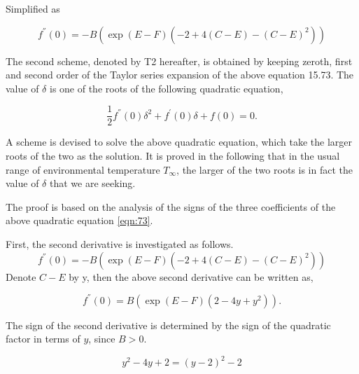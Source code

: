 \documentclass[12pt]{article}
\begin{document}
{Simplified as 

\begin{equation}\label{eqn:38}
f^{''}(0)=-B(\exp(E-F)(-2+4(C-E)-(C-E)^2))
\end{equation}

The second scheme, denoted by T2 hereafter, is obtained by keeping zeroth, first and second order of the Taylor series expansion of the above equation 15.73. The value of $\delta$ is one of the roots of the following quadratic equation,

\begin{equation}\label{eqn:73}
\frac{1}{2}f^{''}(0)\delta^{2}+f^{'}(0)\delta+f(0)=0.
\end{equation}

A scheme is devised to solve the above quadratic equation, which take the larger roots of the two as the solution. 
It is proved in the following that in the usual range of environmental temperature $T_{\infty}$,  the larger of the two roots is in fact the value of $\delta$ that we are seeking. 

The proof is based on the analysis of the signs of the three coefficients of the above quadratic equation \ref{eqn:73}.

First, the second derivative is investigated as follows.
\begin{equation}
f^{''}(0)=-B(\exp(E-F)(-2+4(C-E)-(C-E)^2))
\end{equation}
Denote $C-E$ by y, then the above second derivative can be written as,

\begin{equation}
f^{''}(0)=B(\exp(E-F)(2-4y+y^2)).
\end{equation}

The sign of the second derivative is determined by the sign of the quadratic factor in terms of $y$, 
since $B>0$.

\begin{equation}
y^2-4y+2=(y-2)^2-2
\end{equation}

}
\end{document}
